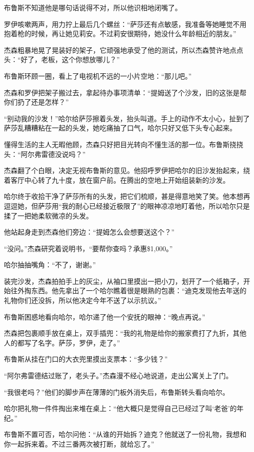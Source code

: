 \documentclass[../main]{subfiles}
\begin{document}
布鲁斯不知道他是哪句话说得不对，所以他识相地闭嘴了。

罗伊咳嗽两声，用力拧上最后几个螺丝：“萨莎还有点敏感，我准备等她睡觉不用抱着枪的时候，再让她见莉安。不过莉安很期待，她没什么年龄相近的朋友。”

杰森粗暴地晃了晃装好的架子，它顽强地承受了他的测试，所以杰森赞许地点点头：“好了，老板，这个你想放哪儿？”

布鲁斯环顾一圈，看上了电视机不远的一小片空地：“那儿吧。”

杰森和罗伊把架子搬过去，拿起待办事项清单：“提姆送了个沙发，旧的这张是帮你们扔了还是怎样？”

“别动我的沙发！”哈尔给萨莎擦着头发，抬头叫道。手上的动作不太小心，扯到了萨莎乱糟糟粘在一起的头发，她吃痛抽了口气，哈尔只好又低下头专心起来。

懂得生活的主人无暇他顾，杰森只好把目光转向不懂生活的那一位。布鲁斯挠挠头：“阿尔弗雷德没说吗？”

杰森翻了个白眼，决定无视布鲁斯的意见。他招呼罗伊把哈尔的旧沙发抬起来，绕着客厅中心转了九十度，放在窗户前。在腾出的空地上开始组装新的沙发。

哈尔终于收拾干净了萨莎所有的头发，把它们梳顺，甚是得意地笑了笑。他本想再逗逗她，但萨莎用“我的耐心已经接近极限了”的眼神凉凉地盯着他，所以哈尔只是揉了一把她柔软微凉的头发。

他站起身走到杰森他们旁边：“提姆怎么会想要送这个？”

“没问。”杰森研究着说明书，“要帮你查吗？承惠\$1,000。”

哈尔抽抽嘴角：“不了，谢谢。”

装完沙发，杰森拍拍手上的灰尘，从袖口里摸出一把小刀，划开了一个纸箱子，开始往外掏东西。他先拿出了一个哈尔瞧着很是眼熟的包裹：“迪克发现他去年送的礼物你们还没拆，所以他决定今年不送了以示抗议。”

布鲁斯困惑地看向哈尔，哈尔递了他一个安抚的眼神：“晚点再说。”

杰森把包裹顺手放在桌上，双手插兜：“我的礼物是给你的搬家费打了九折，其他人的都写了名字。萨莎，罗伊，走了。”

布鲁斯从挂在门口的大衣兜里摸出支票本：“多少钱？”

“阿尔弗雷德结过账了，老头子。”杰森漫不经心地说道，走出公寓关上了门。

“我很老吗？”他们的脚步声在薄薄的门板外消失后，布鲁斯转头看向哈尔。

哈尔把礼物一件件掏出来堆在桌上：“他大概只是觉得自己已经过了叫`老爸'的年纪。”

布鲁斯不置可否，哈尔问他：“从谁的开始拆？迪克？他就送了一份礼物，我想和你一起拆来着。不过三番两次被打断，就给忘了。”
\end{document}
